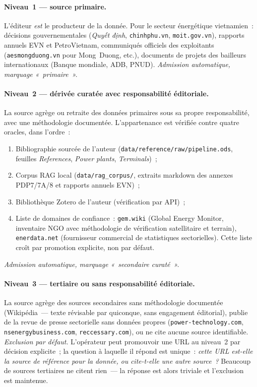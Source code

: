 \paragraph{Niveau~1 --- source primaire.}
L'éditeur \emph{est} le producteur de la donnée. Pour le secteur
énergétique vietnamien~: décisions gouvernementales (\emph{Quyết định},
\texttt{chinhphu.vn}, \texttt{moit.gov.vn}), rapports annuels EVN et
PetroVietnam, communiqués officiels des exploitants
(\texttt{aesmongduong.vn} pour Mong~Duong, etc.), documents de projets
des bailleurs internationaux (Banque mondiale, ADB, PNUD).
\emph{Admission automatique, marquage «~primaire~».}

\paragraph{Niveau~2 --- dérivée curatée avec responsabilité éditoriale.}
La source agrège ou retraite des données primaires sous sa propre
responsabilité, avec une méthodologie documentée. L'appartenance est
vérifiée contre quatre oracles, dans l'ordre~:
\begin{enumerate}
\item Bibliographie sourcée de l'auteur
  (\texttt{data/reference/raw/pipeline.ods}, feuilles \emph{References},
  \emph{Power plants}, \emph{Terminals})~;
\item Corpus RAG local (\texttt{data/rag\_corpus/}, extraits markdown des
  annexes PDP7/7A/8 et rapports annuels EVN)~;
\item Bibliothèque Zotero de l'auteur (vérification par API)~;
\item Liste de domaines de confiance~: \texttt{gem.wiki} (Global Energy
  Monitor, inventaire NGO avec méthodologie de vérification satellitaire
  et terrain), \texttt{enerdata.net} (fournisseur commercial de
  statistiques sectorielles). Cette liste croît par promotion explicite,
  non par défaut.
\end{enumerate}
\emph{Admission automatique, marquage «~secondaire curaté~».}

\paragraph{Niveau~3 --- tertiaire ou sans responsabilité éditoriale.}
La source agrège des sources secondaires sans méthodologie documentée
(Wikipédia~--- texte révisable par quiconque, sans engagement éditorial),
publie de la revue de presse sectorielle sans données propres
(\texttt{power-technology.com}, \texttt{nsenergybusiness.com},
\texttt{reccessary.com}), ou ne cite aucune source identifiable.
\emph{Exclusion par défaut.} L'opérateur peut promouvoir une URL au
niveau~2 par décision explicite~; la question à laquelle il répond est
unique~: \emph{cette URL est-elle la source de référence pour la donnée,
ou cite-t-elle une autre source~?} Beaucoup de sources tertiaires ne
citent rien~--- la réponse est alors triviale et l'exclusion est
maintenue.

